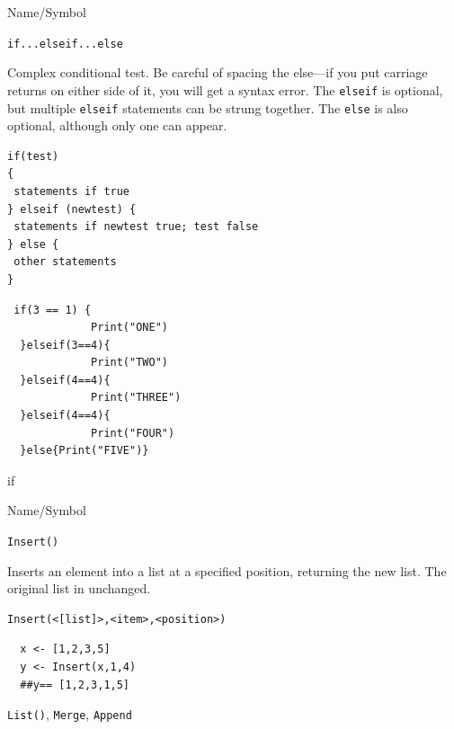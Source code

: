 \begin{desc}{Name/Symbol}
\item[Name/Symbol]	\verb+if...elseif...else+            

\item[Description] Complex conditional test.  Be careful of spacing
  the else---if you put carriage returns on either side of it, you
  will get a syntax error. The \verb+elseif+ is optional, but
  multiple \verb+elseif+ statements can be strung together.  The
  \verb+else+ is also optional, although only one can appear.

\item[Usage]
\begin{verbatim}
if(test)
{
 statements if true
} elseif (newtest) {
 statements if newtest true; test false
} else {
 other statements
} 
\end{verbatim}

\item[Example]	
\begin{verbatim}
 if(3 == 1) {
             Print("ONE")
  }elseif(3==4){
             Print("TWO")
  }elseif(4==4){
             Print("THREE")
  }elseif(4==4){
             Print("FOUR")
  }else{Print("FIVE")}
\end{verbatim}
\item[See Also]	
if
\end{desc}


\begin{desc}{Name/Symbol}
\item[Name/Symbol]	\verb+Insert()+

\item[Description] Inserts an element into a list at a specified
  position, returning the new list. The original list in unchanged.

\item[Usage]	
\begin{verbatim}
Insert(<[list]>,<item>,<position>)	
\end{verbatim}
\item[Example]	

\begin{verbatim}
  x <- [1,2,3,5]
  y <- Insert(x,1,4)  
  ##y== [1,2,3,1,5]  
\end{verbatim}

\item[See Also]	
\verb+List()+, \verb+Merge+, \verb+Append+

\end{desc}



